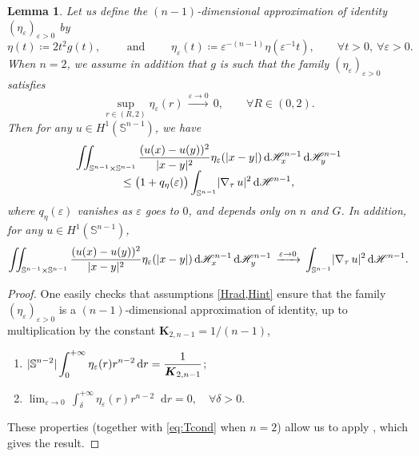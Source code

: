 \documentclass[JEP,XML,SOM,Unicode,published]{cedram}
\newenvironment{enumeratei}
{\bgroup\def\theenumi{\roman{enumi}}\def\theenumii{\arabic{enumii}}\begin{enumerate}}
{\end{enumerate}\egroup}
\numberwithin{equation}{section}
\theoremstyle{plain}
\newtheorem{lem}[thm]{Lemma}
\theoremstyle{definition}
\newcommand{\dr}{\mathop{}\mathopen{}\mathrm{d}r}
\newcommand{\dH}{\mathop{}\mathopen{}\mathrm{d}\mathscr{H}}
\newcommand{\bbS}{\mathbb{S}}
\newcommand{\bfK}{\boldsymbol{K}}
\let\eps\varepsilon
\newcommand{\grad}{\nabla}
\DeclarePairedDelimiter{\abs}{\lvert}{\rvert}
\begin{document}
\begin{lem}\label{lem:cvsphunif}
Let us define the $(n-1)$-dimensional approximation of identity $(\eta_\eps)_{\eps>0}$ by
\[
\eta(t)\coloneqq 2t^2g(t),\qquad\text{ and }\qquad
\eta_\eps(t)\coloneqq\eps^{-(n-1)}\eta(\eps^{-1}t), \qquad\forall t>0,~\forall \eps>0.
\]
When $n=2$, we assume in addition that $g$ is such that the family $(\eta_\eps)_{\eps>0}$ satisfies
\begin{equation}\label{eq:Tcond}
\sup_{r\in (R,2)} \eta_\eps(r)\,\xrightarrow{\eps\to 0}\, 0,\qquad\forall R\in(0,2).
\end{equation}
Then for any $u\in H^1(\bbS^{n-1})$, we have
\begin{multline*}
\iint_{\bbS^{n-1}\times\bbS^{n-1}} \frac{(u(x)-u(y))^2}{\abs{x-y}^2} \eta_\eps(\abs{x-y})
\dH_x^{n-1}\dH_y^{n-1}\\[-5pt]
\leq \big(1+q_\eta(\eps)\big) \int_{\bbS^{n-1}} \abs{\grad_\tau\, u}^2\dH^{n-1},
\end{multline*}
where $q_\eta(\eps)$ vanishes as $\eps$ goes to $0$, and depends only on $n$ and $G$. In addition,
for any $u\in H^1(\bbS^{n-1})$,
\[
\begin{aligned}
\iint_{\bbS^{n-1}\times\bbS^{n-1}} \frac{(u(x)-u(y))^2}{\abs{x-y}^2} \eta_\eps(\abs{x-y})
\dH_x^{n-1}\dH_y^{n-1}
\,\xrightarrow{\eps\to 0}\, \int_{\bbS^{n-1}} \abs{\grad_\tau\, u}^2\dH^{n-1}.
\end{aligned}
\]
\end{lem}

\begin{proof}
One easily checks that assumptions \cref{Hrad,Hint} ensure that the family $(\eta_\eps)_{\eps>0}$ is
a $(n-1)$-dimensional approximation of identity, up to multiplication by the constant
$\bfK_{2,n-1}=1/(n-1)$, \ie
\begin{enumeratei}
\item $\displaystyle \abs{\bbS^{n-2}}\int_0^{+\infty} \eta_{\eps}(r)r^{n-2}\dr =
\frac{1}{\bfK_{2,n-1}}$;
\smallskip

\item$\displaystyle\lim_{\eps \to 0}\, \int_\delta^{+\infty}
\eta_{\eps}(r)r^{n-2} \dr= 0,\quad \forall
\delta > 0$.
\end{enumeratei}
These properties (together with \cref{eq:Tcond} when $n=2$) allow us to apply
\cite[Prop.\,A.1~\&~A.4]{Peg2021}, which gives the result.
\end{proof}
\end{document}
